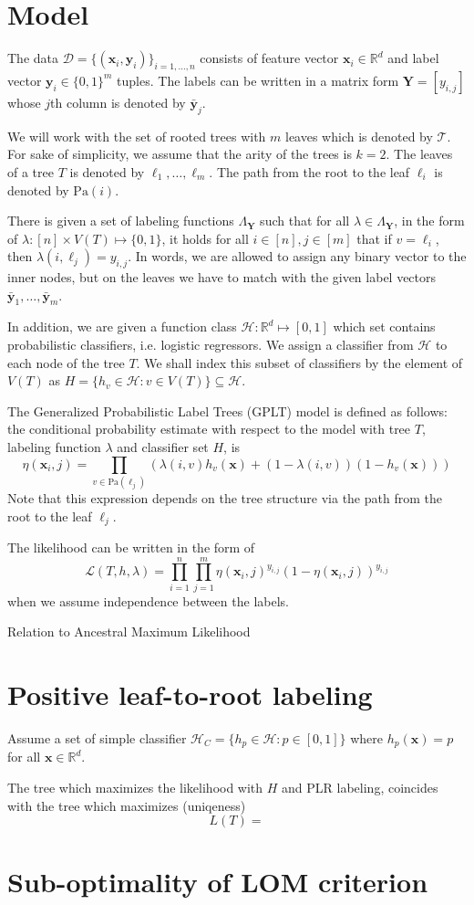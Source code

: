 \documentclass{article}
\newcommand{\R}{\mathbb{R}}
\newcommand{\cD}{\mathcal{D}}
\newcommand{\cH}{\mathcal{H}}
\newcommand{\cL}{\mathcal{L}}
\newcommand{\cT}{\mathcal{T}}
\newcommand{\path}{\text{Pa}}
\renewcommand{\vec}[1]{\mathbf{#1}}
\newcommand{\bx}{\mathbf{x}}
\newcommand{\by}{\vec{y}}
\newcommand{\bY}{\vec{Y}}
\newcommand{\Algo}[1]{\textsc{#1}}
\begin{document}
\section{Model}

The data $\cD = \{ (\bx_{i},\by_{i})\}_{i=1,\dots,n}$ consists of feature vector $\bx_i \in \R^d$ and label vector $\by_i\in \{ 0,1\}^m$ tuples. The labels can be written in a matrix form $\bY = [y_{i,j}]$ whose $j$\/th column is denoted by $\bar{\by}_{j}$.

We will work with the set of rooted trees with $m$ leaves which is denoted by $\cT$. For sake of simplicity, we assume that the arity of the trees is $k=2$. The leaves of a tree $T$ is denoted by $\ell_1, \dots , \ell_m$. The path from the root to the leaf $\ell_i$ is denoted by $\path (i )$. 

There is given a set of labeling functions $\Lambda_{\bY}$ such that for all $\lambda\in \Lambda_{\bY}$, in the form of $\lambda: [n]\times V(T) \mapsto \{0,1\}$, it holds for all $i\in [n], j\in [m]$ that if $v=\ell_i$, then $\lambda(i, \ell_j) = y_{i,j}$. In words, we are allowed to assign any binary vector to the inner nodes, but on the leaves we have to match with the given label vectors $\bar{\by}_1, \dots , \bar{\by}_m$.

In addition, we are given a function class $\cH : \R^d \mapsto [0,1]$ which set contains probabilistic classifiers, i.e. logistic regressors. We assign a classifier from $\cH$ to each node of the tree $T$. We shall index this subset of classifiers by the element of $V(T)$ as $H = \{ h_{v} \in \cH : v\in V(T) \} \subseteq \cH$.

The Generalized Probabilistic Label Trees (GPLT) model is defined as follows: the conditional probability estimate with respect to the model with tree $T$, labeling function $\lambda$ and classifier set $H$,  is
\[
\eta( \bx_i, j ) = \prod_{v \in \path(\ell_j)} \left( \lambda(i, v) h_v (\bx) + (1-\lambda(i, v) ) (1-h_v (\bx)) \right)
\]
Note that this expression depends on the tree structure via the path from the root to the leaf $\ell_j$.

The likelihood can be written in the form of
\[
\cL ( T, h, \lambda) = \prod_{i=1}^{n} \prod_{j=1}^m \eta ( \bx_i , j )^{y_{i,j}} (1-\eta ( \bx_i , j ))^{y_{i,j}}
\]
when we assume independence between the labels.

Relation to Ancestral Maximum Likelihood

\section{Positive leaf-to-root labeling}

Assume a set of simple classifier $\cH_{C} = \{h_p\in \cH : p\in [0,1] \}$ where $h_p(\bx) = p$ for all $\bx \in \R^d$. 

The tree which maximizes the likelihood with $H$ and PLR labeling, coincides with the tree which maximizes (uniqeness)
\[
L(T)=
\]

\section{Sub-optimality of \Algo{LOM} criterion}
\end{document}
